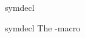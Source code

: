 \documentclass{stex}
\begin{document}
  \begin{smodule}[title=The \texttt{symdecl}-Macro]{symdecl}
  
  \begin{sfunction}{symdecl}{\symdecl}
    The \dcs-macro
  \end{sfunction}
   
  \end{smodule}
\end{document}
